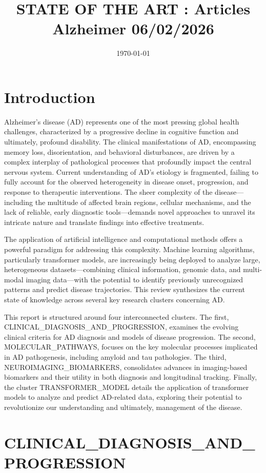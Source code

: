 \documentclass[11pt,a4paper]{article}
\title{STATE OF THE ART : Articles Alzheimer 06/02/2026}
\date{\today}
\begin{document}
\maketitle
\section*{Introduction}
Alzheimer’s disease (AD) represents one of the most pressing global health challenges, characterized by a progressive decline in cognitive function and ultimately, profound disability. The clinical manifestations of AD, encompassing memory loss, disorientation, and behavioral disturbances, are driven by a complex interplay of pathological processes that profoundly impact the central nervous system. Current understanding of AD’s etiology is fragmented, failing to fully account for the observed heterogeneity in disease onset, progression, and response to therapeutic interventions. The sheer complexity of the disease—including the multitude of affected brain regions, cellular mechanisms, and the lack of reliable, early diagnostic tools—demands novel approaches to unravel its intricate nature and translate findings into effective treatments.

The application of artificial intelligence and computational methods offers a powerful paradigm for addressing this complexity. Machine learning algorithms, particularly transformer models, are increasingly being deployed to analyze large, heterogeneous datasets—combining clinical information, genomic data, and multi-modal imaging data—with the potential to identify previously unrecognized patterns and predict disease trajectories. This review synthesizes the current state of knowledge across several key research clusters concerning AD. 

This report is structured around four interconnected clusters. The first, CLINICAL_DIAGNOSIS_AND_PROGRESSION, examines the evolving clinical criteria for AD diagnosis and models of disease progression. The second, MOLECULAR_PATHWAYS, focuses on the key molecular processes implicated in AD pathogenesis, including amyloid and tau pathologies. The third, NEUROIMAGING_BIOMARKERS, consolidates advances in imaging-based biomarkers and their utility in both diagnosis and longitudinal tracking. Finally, the cluster TRANSFORMER_MODEL details the application of transformer models to analyze and predict AD-related data, exploring their potential to revolutionize our understanding and ultimately, management of the disease.

\section{CLINICAL\_DIAGNOSIS\_AND\_PROGRESSION}
\end{document}
